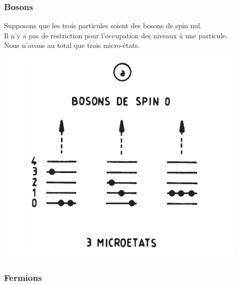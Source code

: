 \documentclass[12pt,oneside]{book}
\begin{document}
\subsubsection{Bosons}
\begin{minipage}{0.7\linewidth}
	Supposons que les trois particules soient des bosons de spin nul.\\
	Il n'y a pas de restriction pour l'occupation des niveaux à une particule.\\
	Nous n'avons au total que trois micro-états.
\end{minipage}
\begin{minipage}{0.3\linewidth}
	\includegraphics[width=\linewidth]{../pic/3306/7}
\end{minipage}
\subsubsection{Fermions}
\end{document}
